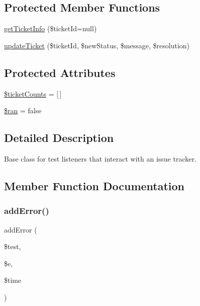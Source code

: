 \subsection*{Protected Member Functions}
\begin{DoxyCompactItemize}
\item 
\mbox{\hyperlink{class_p_h_p_unit___extensions___ticket_listener_a42ca3719940bd24c420952a1915c0bf2}{get\+Ticket\+Info}} (\$ticket\+Id=null)
\item 
\mbox{\hyperlink{class_p_h_p_unit___extensions___ticket_listener_a43c588c670cbb25ccd66288d8c3ee11a}{update\+Ticket}} (\$ticket\+Id, \$new\+Status, \$message, \$resolution)
\end{DoxyCompactItemize}
\subsection*{Protected Attributes}
\begin{DoxyCompactItemize}
\item 
\mbox{\hyperlink{class_p_h_p_unit___extensions___ticket_listener_a454992e91e037a42475677638b5ffcc3}{\$ticket\+Counts}} = \mbox{[}$\,$\mbox{]}
\item 
\mbox{\hyperlink{class_p_h_p_unit___extensions___ticket_listener_a236485243bb2dd552071a5f0b062153d}{\$ran}} = false
\end{DoxyCompactItemize}


\subsection{Detailed Description}
Base class for test listeners that interact with an issue tracker. 

\subsection{Member Function Documentation}
\mbox{\label{class_p_h_p_unit___extensions___ticket_listener_a320d7bc7d2f9264ee7ba7aca6fd2df41}} 
\subsubsection{\texorpdfstring{add\+Error()}{addError()}}
{\footnotesize\ttfamily add\+Error (\begin{DoxyParamCaption}\item[{\mbox{\hyperlink{interface_p_h_p_unit___framework___test}{P\+H\+P\+Unit\+\_\+\+Framework\+\_\+\+Test}}}]{\$test,  }\item[{Exception}]{\$e,  }\item[{}]{\$time }\end{DoxyParamCaption})}

